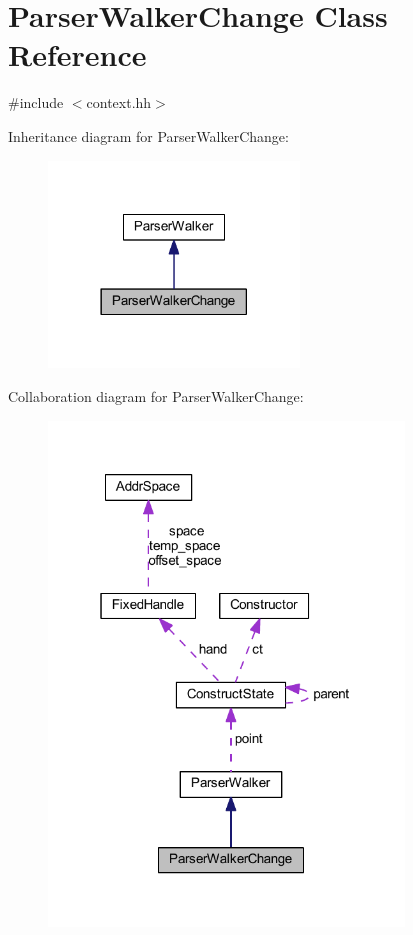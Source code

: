 \hypertarget{class_parser_walker_change}{}\section{Parser\+Walker\+Change Class Reference}
\label{class_parser_walker_change}


{\ttfamily \#include $<$context.\+hh$>$}



Inheritance diagram for Parser\+Walker\+Change\+:
\nopagebreak
\begin{figure}[H]
\begin{center}
\leavevmode
\includegraphics[width=189pt]{class_parser_walker_change__inherit__graph}
\end{center}
\end{figure}


Collaboration diagram for Parser\+Walker\+Change\+:
\nopagebreak
\begin{figure}[H]
\begin{center}
\leavevmode
\includegraphics[width=268pt]{class_parser_walker_change__coll__graph}
\end{center}
\end{figure}
